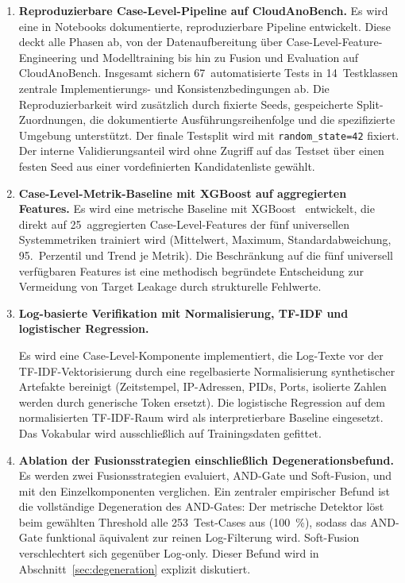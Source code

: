 \begin{enumerate}
  \item \textbf{Reproduzierbare Case-Level-Pipeline auf CloudAnoBench.} Es wird eine
    in Notebooks dokumentierte, reproduzierbare Pipeline entwickelt. Diese deckt alle
    Phasen ab, von der Datenaufbereitung über Case-Level-Feature-Engineering und
    Modelltraining     bis hin zu Fusion und Evaluation auf CloudAnoBench. Insgesamt sichern
    67~automatisierte Tests in 14~Testklassen zentrale Implementierungs- und
    Konsistenzbedingungen ab.
    Die Reproduzierbarkeit wird zusätzlich durch fixierte Seeds, gespeicherte
    Split-Zuordnungen, die dokumentierte Ausführungsreihenfolge und die
    spezifizierte Umgebung unterstützt. Der finale
    Testsplit wird mit \texttt{random\_state=42} fixiert. Der interne Validierungsanteil
    wird ohne Zugriff auf das Testset über einen festen Seed aus einer vordefinierten
    Kandidatenliste gewählt.

  \item \textbf{Case-Level-Metrik-Baseline mit XGBoost auf aggregierten Features.}
    Es wird eine metrische Baseline mit XGBoost~\cite{chen2016xgboost} entwickelt,
    die direkt auf 25~aggregierten Case-Level-Features der fünf universellen Systemmetriken
    trainiert wird (Mittelwert, Maximum, Standardabweichung, 95.~Perzentil und Trend
    je Metrik). Die Beschränkung auf die fünf universell verfügbaren Features ist eine
    methodisch begründete Entscheidung zur Vermeidung von Target Leakage durch
    strukturelle Fehlwerte.

  \item \textbf{Log-basierte Verifikation mit Normalisierung, TF-IDF und logistischer
    Regression.} {\relax Es wird eine Case-Level-Komponente implementiert, die Log-Texte
    vor der TF-IDF-Vektorisierung durch eine regelbasierte Normalisierung synthetischer
    Artefakte bereinigt (Zeitstempel, IP-Adressen, PIDs, Ports, isolierte Zahlen werden
    durch generische Token ersetzt). Die logistische Regression auf dem normalisierten
    TF-IDF-Raum wird als interpretierbare Baseline eingesetzt. Das Vokabular wird
    ausschließlich auf Trainingsdaten gefittet.\par}

  \item \textbf{Ablation der Fusionsstrategien einschließlich Degenerationsbefund.}
    Es werden zwei Fusionsstrategien evaluiert, AND-Gate und Soft-Fusion,
    und mit den Einzelkomponenten verglichen. Ein zentraler empirischer Befund
    ist die vollständige Degeneration des AND-Gates: Der metrische Detektor löst
    beim gewählten Threshold alle 253~Test-Cases aus (100~\%), sodass das AND-Gate
    funktional äquivalent zur reinen Log-Filterung wird. Soft-Fusion verschlechtert
    sich gegenüber Log-only. Dieser Befund wird in Abschnitt~\ref{sec:degeneration}
    explizit diskutiert.


\end{enumerate}
